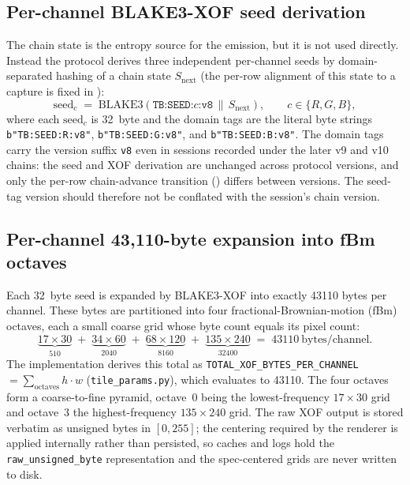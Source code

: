 \subsection{Per-channel BLAKE3-XOF seed derivation}
\label{subsec:pc_seed}

The chain state is the entropy source for the emission, but it is not used directly. Instead the protocol derives three independent per-channel seeds by domain-separated hashing of a chain state $S_{\mathrm{next}}$ (the per-row alignment of this state to a capture is fixed in ):
\begin{equation}
\mathrm{seed}_{c} \;=\; \mathrm{BLAKE3}\!\left(\texttt{TB:SEED:}c\texttt{:v8} \,\|\, S_{\mathrm{next}}\right),
\qquad c \in \{R, G, B\},
\label{eq:pc_seed}
\end{equation}
where each $\mathrm{seed}_c$ is \SI{32}{byte} and the domain tags are the literal byte strings \texttt{b"TB:SEED:R:v8"}, \texttt{b"TB:SEED:G:v8"}, and \texttt{b"TB:SEED:B:v8"}. The domain tags carry the version suffix \texttt{v8} even in sessions recorded under the later v9 and v10 chains: the seed and XOF derivation are unchanged across protocol versions, and only the per-row chain-advance transition () differs between versions. The seed-tag version should therefore not be conflated with the session's chain version.

\subsection{Per-channel 43{,}110-byte expansion into fBm octaves}
\label{subsec:pc_octaves}

Each \SI{32}{byte} seed is expanded by BLAKE3-XOF into exactly \num{43110} bytes per channel. These bytes are partitioned into four fractional-Brownian-motion (fBm) octaves, each a small coarse grid whose byte count equals its pixel count:
\begin{equation}
\underbrace{17\times 30}_{510}
\;+\;\underbrace{34\times 60}_{2040}
\;+\;\underbrace{68\times 120}_{8160}
\;+\;\underbrace{135\times 240}_{32400}
\;=\;\num{43110}\ \text{bytes/channel}.
\label{eq:pc_octaves}
\end{equation}
The implementation derives this total as \texttt{TOTAL\_XOF\_BYTES\_PER\_CHANNEL} $= \sum_{\text{octaves}} h\cdot w$ (\texttt{tile\_params.py}), which evaluates to \num{43110}. The four octaves form a coarse-to-fine pyramid, octave~0 being the lowest-frequency $17\times30$ grid and octave~3 the highest-frequency $135\times240$ grid. The raw XOF output is stored verbatim as unsigned bytes in $[0,255]$; the centering required by the renderer is applied internally rather than persisted, so caches and logs hold the \texttt{raw\_unsigned\_byte} representation and the spec-centered grids are never written to disk.

